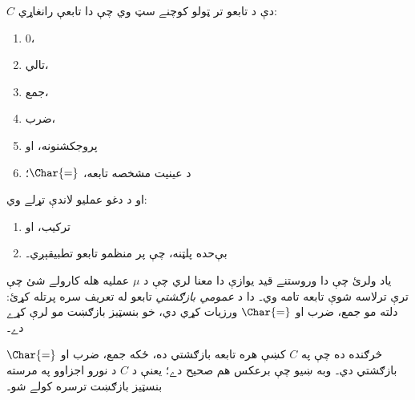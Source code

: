 \documentclass[../../../include/open-logic-section]{subfiles}
\begin{document}

$C$ دې د تابعو تر ټولو کوچنے سټ وي چې دا تابعې رانغاړي:
\begin{enumerate}
\item $0$،
\item تالي،
\item جمع،
\item ضرب،
\item پروجکشنونه، او
\item د عينيت مشخصه تابعه، $\Char{=}$؛
\end{enumerate}
او د دغو عمليو لاندې تړلے وي:
\begin{enumerate}
\item ترکيب، او
\item بې‌حده پلټنه، چې پر منظمو تابعو تطبيقېږي۔
\end{enumerate}
ياد ولرئ چې دا وروستنے قيد يوازې دا معنا لري چې د $\mu$ عمليه هله کارولے شئ چې ترې ترلاسه شوې تابعه تامه وي۔ دا د \emph{عمومي بازګشتي} تابعو له تعريف سره پرتله کړئ: دلته مو جمع، ضرب او $\Char{=}$ ورزيات کړي دي، خو بنسټيز بازګښت مو لرې کړے دے۔

څرګنده ده چې په $C$ کښې هره تابعه بازګشتي ده، ځکه جمع، ضرب او $\Char{=}$ بازګشتي دي۔ وبه ښيو چې برعکس هم صحيح دے؛ يعنې د $C$ د نورو اجزاوو په مرسته بنسټيز بازګښت ترسره کولے شو۔
\end{document}

